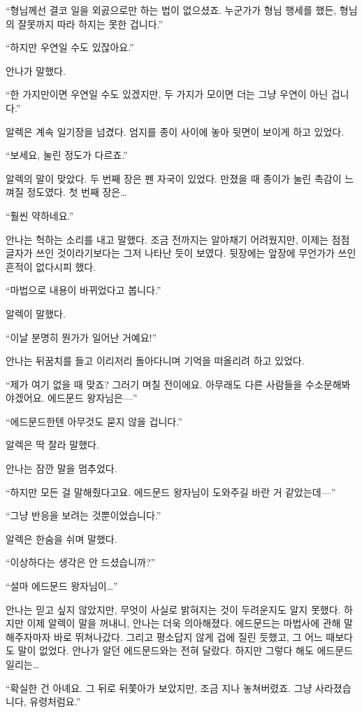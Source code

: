 ``형님께선 결코 일을 외곬으로만 하는 법이 없으셨죠. 누군가가 형님 행세를 했든, 형님의 잘못까지 따라 하지는 못한 겁니다.''

``하지만 우연일 수도 있잖아요.''

안나가 말했다.

``한 가지만이면 우연일 수도 있겠지만, 두 가지가 모이면 더는 그냥 우연이 아닌 겁니다.''

알렉은 계속 일기장을 넘겼다. 엄지를 종이 사이에 놓아 뒷면이 보이게 하고 있었다.

``보세요, 눌린 정도가 다르죠.''

알렉의 말이 맞았다. 두 번째 장은 펜 자국이 있었다. 만졌을 때 종이가 눌린 촉감이 느껴질 정도였다. 첫 번째 장은\ldots

``훨씬 약하네요.''

안나는 헉하는 소리를 내고 말했다. 조금 전까지는 알아채기 어려웠지만, 이제는 점점 글자가 쓰인 것이라기보다는 그저 나타난 듯이 보였다. 뒷장에는 앞장에 무언가가 쓰인 흔적이 없다시피 했다.

``마법으로 내용이 바뀌었다고 봅니다.''

알렉이 말했다.

``이날 분명히 뭔가가 일어난 거예요!''

안나는 뒤꿈치를 들고 이리저리 돌아다니며 기억을 떠올리려 하고 있었다.

``제가 여기 없을 때 맞죠? 그러기 며칠 전이에요. 아무래도 다른 사람들을 수소문해봐야겠어요. 에드문드 왕자님은—''

``에드문드한텐 아무것도 묻지 않을 겁니다.''

알렉은 딱 잘라 말했다.

안나는 잠깐 말을 멈추었다.

``하지만 모든 걸 말해줬다고요. 에드문드 왕자님이 도와주길 바란 거 같았는데—''

``그냥 반응을 보려는 것뿐이었습니다.''

알렉은 한숨을 쉬며 말했다.

``이상하다는 생각은 안 드셨습니까?''

``설마 에드문드 왕자님이\ldots''

안나는 믿고 싶지 않았지만, 무엇이 사실로 밝혀지는 것이 두려운지도 알지 못했다. 하지만 이제 알렉이 말을 꺼내니, 안나는 더욱 의아해졌다. 에드문드는 마법사에 관해 말해주자마자 바로 뛰쳐나갔다. 그리고 평소답지 않게 겁에 질린 듯했고, 그 어느 때보다도 말이 없었다. 안나가 알던 에드문드와는 전혀 달랐다. 하지만 그렇다 해도 에드문드일리는\ldots

``확실한 건 아녜요. 그 뒤로 뒤쫓아가 보았지만, 조금 지나 놓쳐버렸죠. 그냥 사라졌습니다, 유령처럼요.''


